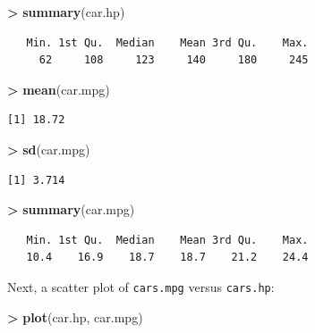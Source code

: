 \documentclass[]{krantz}
\makeatletter
\newenvironment{Shaded}{\begin{snugshade}}{\end{snugshade}}
\newcommand{\KeywordTok}[1]{\textcolor[rgb]{0.27,0.27,0.27}{\textbf{#1}}}
\newcommand{\StringTok}[1]{\textcolor[rgb]{0.5,0.5,0.5}{#1}}
\newcommand{\OperatorTok}[1]{\textcolor[rgb]{0.43,0.43,0.43}{\textbf{#1}}}
\newcommand{\NormalTok}[1]{#1}
\newenvironment{kframe}{%
\medskip{}
\setlength{\fboxsep}{.8em}
 \def\at@end@of@kframe{}%
 \ifinner\ifhmode%
  \def\at@end@of@kframe{\end{minipage}}%
  \begin{minipage}{\columnwidth}%
 \fi\fi%
 \def\FrameCommand##1{\hskip\@totalleftmargin \hskip-\fboxsep
 \colorbox{shadecolor}{##1}\hskip-\fboxsep
     \hskip-\linewidth \hskip-\@totalleftmargin \hskip\columnwidth}%
 \MakeFramed {\advance\hsize-\width
   \@totalleftmargin\z@ \linewidth\hsize
   \@setminipage}}%
 {\par\unskip\endMakeFramed%
 \at@end@of@kframe}
\renewenvironment{Shaded}{\begin{kframe}}{\end{kframe}}
\makeatother
\begin{document}
\begin{Shaded}
\begin{Highlighting}[]
\OperatorTok{>}\StringTok{ }\KeywordTok{summary}\NormalTok{(car.hp)}
\end{Highlighting}
\end{Shaded}

\begin{verbatim}
   Min. 1st Qu.  Median    Mean 3rd Qu.    Max. 
     62     108     123     140     180     245 
\end{verbatim}

\begin{Shaded}
\begin{Highlighting}[]
\OperatorTok{>}\StringTok{ }\KeywordTok{mean}\NormalTok{(car.mpg)}
\end{Highlighting}
\end{Shaded}

\begin{verbatim}
[1] 18.72
\end{verbatim}

\begin{Shaded}
\begin{Highlighting}[]
\OperatorTok{>}\StringTok{ }\KeywordTok{sd}\NormalTok{(car.mpg)}
\end{Highlighting}
\end{Shaded}

\begin{verbatim}
[1] 3.714
\end{verbatim}

\begin{Shaded}
\begin{Highlighting}[]
\OperatorTok{>}\StringTok{ }\KeywordTok{summary}\NormalTok{(car.mpg)}
\end{Highlighting}
\end{Shaded}

\begin{verbatim}
   Min. 1st Qu.  Median    Mean 3rd Qu.    Max. 
   10.4    16.9    18.7    18.7    21.2    24.4 
\end{verbatim}

Next, a scatter plot of \texttt{cars.mpg} versus \texttt{cars.hp}:

\begin{Shaded}
\begin{Highlighting}[]
\OperatorTok{>}\StringTok{ }\KeywordTok{plot}\NormalTok{(car.hp, car.mpg)}
\end{Highlighting}
\end{Shaded}
\end{document}
